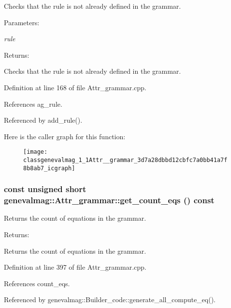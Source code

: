 Checks that the rule is not already defined in the grammar. \begin{Desc}
\item[Parameters:]
\begin{description}
\item[{\em rule}]\end{description}
\end{Desc}
\begin{Desc}
\item[Returns:]\end{Desc}
Checks that the rule is not already defined in the grammar. 

Definition at line 168 of file Attr\_\-grammar.cpp.

References ag\_\-rule.

Referenced by add\_\-rule().

Here is the caller graph for this function:\nopagebreak
\begin{figure}[H]
\begin{center}
\leavevmode
\texttt{[image: classgenevalmag\_1\_1Attr\_\_grammar\_3d7a28dbbd12cbfc7a0bb41a7f8b8ab7\_icgraph]}
\end{center}
\end{figure}
\hypertarget{classgenevalmag_1_1Attr__grammar_d94a52850c818a1f74fc81af99b0d52d}{
\subsubsection[{get\_\-count\_\-eqs}]{\setlength{\rightskip}{0pt plus 5cm}const unsigned short genevalmag::Attr\_\-grammar::get\_\-count\_\-eqs () const}}
\label{classgenevalmag_1_1Attr__grammar_d94a52850c818a1f74fc81af99b0d52d}


Returns the count of equations in the grammar. \begin{Desc}
\item[Returns:]\end{Desc}
Returns the count of equations in the grammar. 

Definition at line 397 of file Attr\_\-grammar.cpp.

References count\_\-eqs.

Referenced by genevalmag::Builder\_\-code::generate\_\-all\_\-compute\_\-eq().

